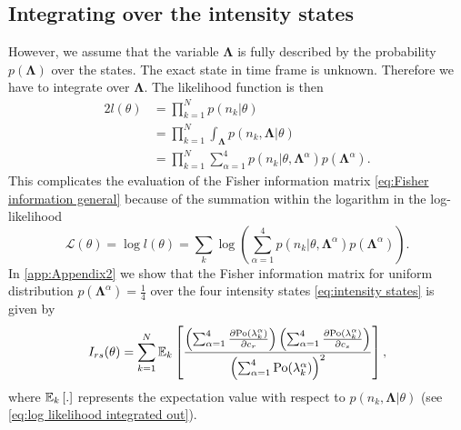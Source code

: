 \subsection{Integrating over the intensity states\label{sub:FI int out}}
%
However, we assume that the variable $\bm{\Lambda}$ is fully described by the probability $p(\bm{\Lambda})$ over the states. The exact state in time frame is unknown. Therefore we have to integrate over $\bm{\Lambda}$. The likelihood function is then
%
\begin{alignat}{2}
	l(\theta)
	&=\prod_{k=1}^Np(n_k|\theta)\nonumber\\
	&=\prod_{k=1}^N\int_{\bm{\Lambda}}p(n_k,\bm{\Lambda}|\theta)\nonumber\\
	&=\prod_{k=1}^N\sum_{\alpha=1}^4p(n_k|\theta,\bm{\Lambda}^\alpha)p(\bm{\Lambda}^\alpha).
	\label{eq:FREM likelihood Lambda integrated out}
\end{alignat}
%
This complicates the evaluation of the Fisher information matrix \autoref{eq:Fisher information general} because of the summation within the logarithm in the log-likelihood
%
\begin{equation}
	\mathcal{L}(\theta)=\log l(\theta)=\sum_k\log\left(\sum_{\alpha=1}^4p(n_k|\theta,\bm{\Lambda}^\alpha)p(\bm{\Lambda}^\alpha)\right).
	\label{eq:log likelihood integrated out}
\end{equation}
%
In \autoref{app:Appendix2} we show that the Fisher information matrix for uniform distribution $p(\bm{\Lambda}^\alpha)=\frac{1}{4}$ over the four intensity states \autoref{eq:intensity states} is given by
%
\begin{equation}
	I_{rs}(\theta) =\sum_{k=1}^N\mathbb{E}_k\left[\frac{\left(\sum_{\alpha=1}^4\frac{\partial\mathrm{Po}(\lambda_k^\alpha)}{\partial c_r}\right)\left(\sum_{\alpha=1}^4\frac{\partial\mathrm{Po}(\lambda_k^\alpha)}{\partial c_s}\right)}{\left(\sum_{\alpha=1}^4\mathrm{Po}(\lambda_k^\alpha)\right)^2}\right],
	\label{eq:Fisher Information Blinking Integrating Out}
\end{equation}
%
where $\mathbb{E}_k\left[.\right]$ represents the expectation value with respect to $p(n_k,\bm{\Lambda}|\theta)$ (see \autoref{eq:log likelihood integrated out}). 


